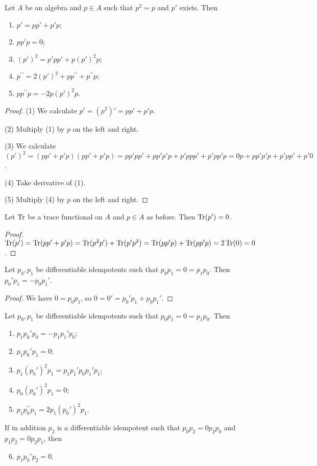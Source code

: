 \begin{proposition} \label{derivativeIdempotent}
Let $A$ be an algebra and $p\in A$ such that $p^2 = p$ and $p'$ exists. Then
\begin{enumerate}
\item $p' = pp'+ p'p$;
\item $pp'p = 0$;
\item $(p')^2 = p'pp' + p(p')^2p$;
\item $p^{\prime\prime} = 2(p')^2 + pp^{\prime\prime} + p^{\prime\prime}p$;
\item $pp^{\prime\prime}p = -2p(p')^2p$.
\end{enumerate}
\end{proposition}
\begin{proof}
(1) We calculate $p' = (p^2)' = pp'+ p'p$.

(2) Multiply (1) by $p$ on the left and right.

(3) We calculate $(p')^2 = (pp'+ p'p)(pp'+ p'p) = pp'pp' + pp'p'p + p'ppp' + p'pp'p = 0p + pp'p'p + p'pp' + p'0$.

(4) Take derivative of (1).

(5) Multiply (4) by $p$ on the left and right.
\end{proof}
\begin{corollary}
Let $\operatorname{Tr}$ be a trace functional on $A$ and $p\in A$ as before. Then $\operatorname{Tr}(p') = 0$.
\end{corollary}
\begin{proof}
$\operatorname{Tr}(p') = \operatorname{Tr}(pp'+ p'p) = \operatorname{Tr}(p^2p')+ \operatorname{Tr}(p'p^2) = \operatorname{Tr}(pp'p) + \operatorname{Tr}(pp'p) = 2\operatorname{Tr}(0) = 0$.
\end{proof}
\begin{proposition}
Let $p_0,p_1$ be differentiable idempotents such that $p_0p_1 = 0 = p_1p_0$. Then $p_0'p_1 = -p_0p_1'$.
\end{proposition}
\begin{proof}
We have $0 = p_0p_1$, so $0 = 0' = p_0'p_1 + p_0p_1'$.
\end{proof}
\begin{corollary}
Let $p_0,p_1$ be differentiable idempotents such that $p_0p_1 = 0 = p_1p_0$. Then
\begin{enumerate}
\item $p_1p_0'p_0 = -p_1p_1'p_0$;
\item $p_1p_0'p_1 = 0$;
\item $p_1(p_0')^2p_1 = p_1p_1'p_0p_1'p_1$;
\item $p_0(p_0')^2p_1 = 0$;
\item $p_1p^{\prime\prime}_0p_1 = 2p_1(p_0')^2p_1$.
\end{enumerate}
If in addition $p_2$ is a differentiable idempotent such that $p_0p_2 = 0 p_2p_0$ and $p_1p_2 = 0 p_2p_1$, then
\begin{enumerate} \setcounter{enumi}{5}
\item $p_1p_0'p_2 = 0$.
\end{enumerate}
\end{corollary}
